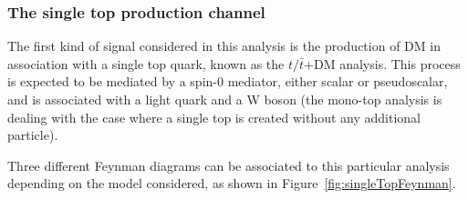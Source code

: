 \documentclass[a4paper, 10pt, openright]{report}
\begin{document}
\subsubsection{The single top production channel} \label{subsection:singleTopChannel}

The first kind of signal considered in this analysis is the production of \ac{DM} in association with a single top quark, known as the $t/\bar t$+DM analysis. This process is expected to be mediated by a spin-0 mediator, either scalar or pseudoscalar, and is associated with a light quark and a W boson (the mono-top analysis is dealing with the case where a single top is created without any additional particle). 

Three different Feynman diagrams can be associated to this particular analysis depending on the model considered, as shown in Figure~\ref{fig:singleTopFeynman}.

\end{document}
